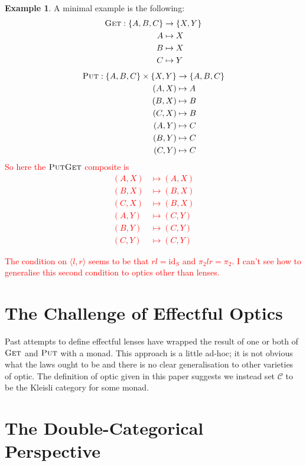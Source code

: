 \documentclass[11pt,a4paper]{article}
\theoremstyle{plain}
\theoremstyle{definition}
\newtheorem{example}[theorem]{Example}
\newcommand{\C}{\mathscr{C}}
\newcommand{\id}{\mathrm{id}}
\newcommand{\fget}{\textsc{Get}}
\newcommand{\fput}{\textsc{Put}}
\newcommand{\todo}[1]{\textcolor{red}{\small #1}}
\begin{document}
\begin{example}
A minimal example is the following:
\begin{align*}
\fget : \{A,B,C\} &\to \{X, Y\} \\
A &\mapsto X \\
B &\mapsto X \\
C &\mapsto Y 
\end{align*}
\begin{align*}
\fput : \{A,B,C\} \times \{X, Y\} &\to \{A,B,C\} \\
(A,X) &\mapsto A \\
(B,X) &\mapsto B \\
(C,X) &\mapsto B \\
(A,Y) &\mapsto C \\
(B,Y) &\mapsto C \\
(C,Y) &\mapsto C
\end{align*}
\todo{So here the $\fput\fget$ composite is
\begin{align*}
(A,X) &\mapsto (A,X) \\
(B,X) &\mapsto (B,X) \\
(C,X) &\mapsto (B,X) \\
(A,Y) &\mapsto (C,Y) \\
(B,Y) &\mapsto (C,Y) \\
(C,Y) &\mapsto (C,Y)
\end{align*}
}
\end{example}

\todo{The condition on $\langle l, r \rangle$ seems to be that $rl = \id_S$ and $\pi_2lr = \pi_2$. I can't see how to generalise this second condition to optics other than lenses.}

\section{The Challenge of Effectful Optics}

Past attempts \cite{ReflectionsOnMonadicLenses} to define effectful lenses have wrapped the result of one or both of $\fget$ and $\fput$ with a monad. This approach is a little ad-hoc; it is not obvious what the laws ought to be and there is no clear generalisation to other varieties of optic. The definition of optic given in this paper suggests we instead set $\C$ to be the Kleisli category for some monad.

\section{The Double-Categorical Perspective}
\end{document}
